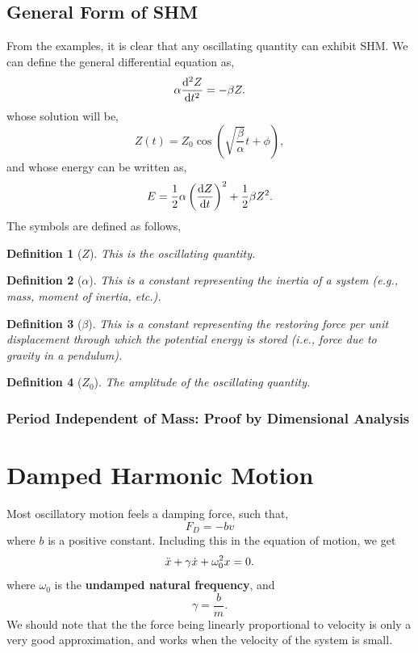 \documentclass{book}
\newtheorem*{definition}{Definition}
\begin{document}
\section{General Form of SHM}
From the examples, it is clear that any oscillating quantity can exhibit SHM. We can define the general differential equation as,
\begin{equation}
    \alpha \dv[2]{Z}{t} = -\beta Z.
\end{equation}
whose solution will be,
\begin{equation}
    Z(t) = Z_0 \cos\left(\sqrt{\frac{\beta}{\alpha}}t + \phi\right),
\end{equation}
and whose energy can be written as,
\begin{equation}
    E = \frac{1}{2}\alpha\left(\dv{Z}{t}\right)^2 + \frac{1}{2}\beta Z^2.
\end{equation}
The symbols are defined as follows,
\begin{definition}[$Z$]
    This is the oscillating quantity.
\end{definition}
\begin{definition}[$\alpha$]
    This is a constant representing the inertia of a system (e.g., mass, moment of inertia, etc.).
\end{definition}
\begin{definition}[$\beta$]
    This is a constant representing the restoring force per unit displacement through which the potential energy is stored (i.e., force due to gravity in a pendulum).
\end{definition}
\begin{definition}[$Z_0$]
    The amplitude of the oscillating quantity.
\end{definition}
\subsection{Period Independent of Mass: Proof by Dimensional Analysis}
\chapter{Damped Harmonic Motion}
Most oscillatory motion feels a damping force, such that,
\begin{equation}
    F_D = -bv
\end{equation}
where $b$ is a positive constant. Including this in the equation of motion, we get
\begin{equation}\label{eqdamp}
    \Ddot{x} + \gamma \Dot{x} + \omega_0^2x = 0.
\end{equation}
where $\omega_0$ is the \textbf{undamped natural frequency}, and
\begin{equation}
    \gamma = \frac{b}{m}.
\end{equation}
We should note that the the force being linearly proportional to velocity is only a very good approximation, and works when the velocity of the system is small.
\end{document}
